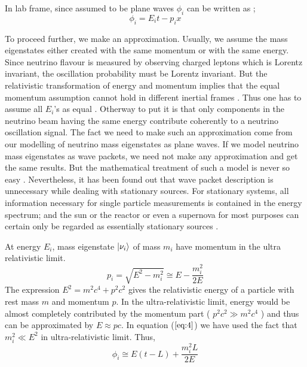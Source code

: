 \documentclass[12pt,a4paper]{report}
\begin{document}
In lab frame, since assumed to be plane waves $\phi_{i}$ can be written as ;
\begin{equation}
\phi_{i} = E_{i} t - p_{i}x
\end{equation}

To proceed further, we make an approximation. Usually, we assume the mass eigenstates either created with the same momentum or with the same energy. Since neutrino flavour is measured by observing charged leptons which is Lorentz invariant, the oscillation probability must be Lorentz invariant. But the relativistic transformation of energy and momentum implies that the equal momentum assumption cannot hold in different inertial frames \cite{giunti2003}. Thus one has to assume all $E_{i}$’s as equal \cite{stodolsky}\cite{lipkin}\cite{obkun}. Otherway to put it is that only components in the neutrino beam having the same energy contribute coherently to a neutrino oscillation signal.  The fact we need to make such an approximation come from our modelling of neutrino mass eigenstates as plane waves. If we model neutrino mass eigenstates as wave packets, we need not make any approximation and get the same results. But the mathematical treatment of such a model is never so easy \cite{giunti1991}\cite{giunti1998}\cite{giunti2004}. Nevertheless, it has been found out that wave packet description is unnecessary while dealing with stationary sources. For stationary systems, all information necessary for single particle measurements is contained in the energy spectrum; and the sun or the reactor or even a supernova for most purposes can certain only be regarded as essentially stationary sources \cite{stodolsky}. \par
At energy $E_{i}$, mass eigenstate $\ket{\nu_{i}}$ of mass $m_{i}$ have momentum in the ultra relativistic limit.
\begin{equation}
\label{eq:4}
p_{i} = \sqrt{ E^{2} - m_{i}^{2}} \cong E-\frac{m_{i}^{2}}{2E}
\end{equation}
The expression $E^{2} = m^{2}c^{4} + p^{2}c^{2}$ gives the relativistic energy of a particle with rest mass $m$ and momentum $p$. In the ultra-relativistic limit, energy would be almost completely contributed by the momentum part ( $ p^{2}c^{2} \gg m^{2}c^{4}$ ) and thus can be approximated by $ E \approx pc $. In equation ($\ref{eq:4}$) we have used the fact that $m_{i}^2 \ll E^{2}$ in ultra-relativistic limit. Thus,
\begin{equation}
\label{eq:5}
\phi_{i} \cong E( t - L) + \frac{m_{i}^2 L}{2E}
\end{equation}
\end{document}
